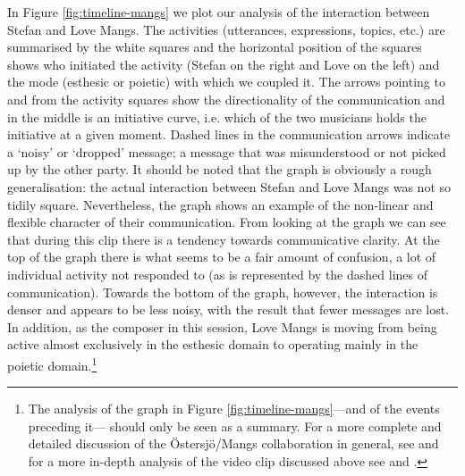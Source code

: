 


\label{sec:1-par:3}
In Figure \ref{fig:timeline-mangs} we plot our analysis of the interaction between Stefan and Love Mangs. The activities (utterances, expressions, topics, etc.) are summarised by the white squares and the horizontal position of the squares shows who initiated the activity (Stefan on the right and Love on the left) and the mode (esthesic or poietic) with which we coupled it. The arrows pointing to and from the activity squares show the directionality of the communication and in the middle is an initiative curve, i.e. which of the two musicians holds the initiative at a given moment. Dashed lines in the communication arrows indicate a `noisy' or `dropped' message; a message that was misunderstood or not picked up by the other party. It should be noted that the graph is obviously a rough generalisation: the actual interaction between Stefan and Love Mangs was not so tidily square. Nevertheless, the graph shows an example of the non-linear and flexible character of their communication. From looking at the graph we can see that during this clip there is a tendency towards communicative clarity. At the top of the graph there is what seems to be a fair amount of confusion, a lot of individual activity not responded to (as is represented by the dashed lines of communication). Towards the bottom of the graph, however, the interaction is denser and appears to be less noisy, with the result that fewer messages are lost. In addition, as the composer in this session, Love Mangs is moving from being active almost exclusively in the esthesic domain to operating mainly in the poietic domain.\footnote{The analysis of the graph in Figure \ref{fig:timeline-mangs}---and of the events preceding it--- should only be seen as a summary. For a more complete and detailed discussion of the \"{O}stersj\"{o}/Mangs collaboration in general, see \cite[Chap.~3]{ostersjo08} and for a more in-depth analysis of the video clip discussed above see \cite[Sec.~3.2]{frisk-ost06} and \cite[Sec.~4]{frisk-ost06-2}.}


